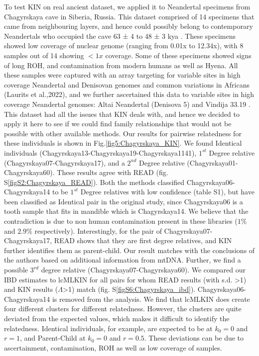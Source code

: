 \documentclass[12pt, letterpaper]{article}
\begin{document}
To test KIN on real ancient dataset, we applied it to Neandertal specimens from Chagyrskaya cave in Siberia, Russia. This dataset comprised of 14 specimens that came from neighbouring layers, and hence could possibly belong to contemporary Neandertals who occupied the cave 63 ± 4 to 48 ± 3 kya \cite{kolobova_archaeological_2020-1}. These specimens showed low coverage of nuclear genome (ranging from 0.01x to 12.34x), with 8 samples out of 14 showing $<1x$ coverage. Some of these specimens showed signs of long ROH, and contamination from modern humans as well as Hyena. All these samples were captured with an array targeting for variable sites in high coverage Neandertal and Denisovan genomes and common variations in Africans (Laurits et al.,2022), and we further ascertained this data to variable sites in high coverage Neandertal genomes: Altai Neandertal (Denisova 5) \cite{prufer_complete_2014} and Vindija 33.19 \cite{prufer_high-coverage_2017}. This dataset had all the issues that KIN deals with, and hence we decided to apply it here to see if we could find family relationships that would not be possible with other available methods. Our results for pairwise relatedness for these individuals is shown in Fig.\ref{fig5:Chagyrskaya_KIN}. We found Identical individuals (Chagyrskaya13-Chagyrskaya19-Chagyrskaya1141), $1^{st}$ Degree relative (Chagyrskaya07-Chagyrskaya17), and a $2^{nd}$ Degree relative (Chagyrskaya01-Chagyrskaya60). These results agree with READ (fig. S\ref{figS2:Chagyrskaya_READ}). Both the methods classified Chagyrskaya06-Chagyrskaya14 to be $1^{st}$ Degree relatives with low confidence (table S1), but have been classified as Identical pair in the original study, since Chagyrskaya06 is a tooth sample that fits in mandible which is Chagyrskaya14. We believe that the contradiction is due to non human contamination present in these libraries ($1\%$ and $2.9\%$ respectively). Interestingly, for the pair of Chagyrskaya07-Chagyrskaya17, READ shows that they are first degree relatives, and KIN further identifies them as parent-child. Our result matches with the conclusions of the authors based on additional information from mtDNA. Further, we find a possible $3^{rd}$ degree relative (Chagyrskaya07-Chagyrskaya60). We compared our IBD estimates to lcMLKIN for all pairs for whom READ results (with s.d. >1) and KIN results ($\Lambda$>1) match (fig. S\ref{figS6:Chagyrskaya_ibd}). Chagyrskaya06-Chagyrskaya14 is removed from the analysis. We find that lcMLKIN does create four different clusters for different relatedness. However, the clusters are quite deviated from the expected values, which makes it difficult to identify the relatedness. Identical individuals, for example, are expected to be at $k_0 = 0$ and $r = 1$, and Parent-Child at $k_0 = 0$ and $r = 0.5$. These deviations can be due to ascertainment, contamination, ROH as well as low coverage of samples.
\end{document}

